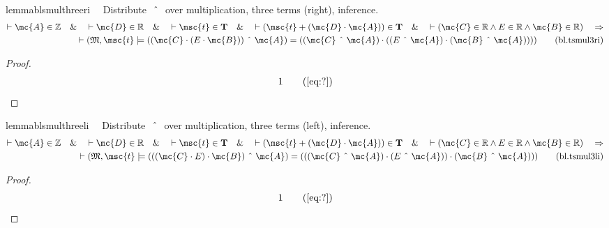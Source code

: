 \begin{restatable}{lemma}{blsmulthreeri}~~ Distribute $~\string^~$ over
multiplication, three terms (right), inference.
\begin{align}
\vdash \mc{A} \in \mathbb{Z}\quad\&\quad \vdash \mc{D} \in
    \mathbb{R}\quad\&\quad \vdash \msc{t} \in \mathbf{T}\quad\&\quad \vdash (
    \msc{t} + ( \mc{D} \cdot \mc{A} ) ) \in \mathbf{T}\quad\&\quad \vdash (
    \mc{C} \in \mathbb{R} \wedge E \in \mathbb{R} \wedge \mc{B} \in \mathbb{R}
    )\quad\Rightarrow \notag \\ 
	\quad \vdash ( \mathfrak{M} , \msc{t} \models ( ( \mc{C}
    \cdot ( E \cdot \mc{B} ) ) ~\string^~ \mc{A} ) = ( ( \mc{C} ~\string^~
    \mc{A} ) \cdot ( ( E ~\string^~ \mc{A} ) \cdot ( \mc{B} ~\string^~ \mc{A} )
    ) ) )\label{eq:bl.tsmul3ri}\tag{bl.tsmul3ri}
\end{align}
\end{restatable}

\begin{proof}
\begin{align}
  1 &&  & &(\mbox{\ref{eq:?}})\notag
\end{align}
\end{proof}

\begin{restatable}{lemma}{blsmulthreeli}~~ Distribute $~\string^~$ over
multiplication, three terms (left), inference.
\begin{align}
\vdash \mc{A} \in \mathbb{Z}\quad\&\quad \vdash \mc{D} \in
    \mathbb{R}\quad\&\quad \vdash \msc{t} \in \mathbf{T}\quad\&\quad \vdash (
    \msc{t} + ( \mc{D} \cdot \mc{A} ) ) \in \mathbf{T}\quad\&\quad \vdash (
    \mc{C} \in \mathbb{R} \wedge E \in \mathbb{R} \wedge \mc{B} \in \mathbb{R}
    )\quad\Rightarrow \notag \\ 
	\quad \vdash ( \mathfrak{M} , \msc{t} \models ( ( ( \mc{C}
    \cdot E ) \cdot \mc{B} ) ~\string^~ \mc{A} ) = ( ( ( \mc{C} ~\string^~
    \mc{A} ) \cdot ( E ~\string^~ \mc{A} ) ) \cdot ( \mc{B} ~\string^~ \mc{A} )
    ) )\label{eq:bl.tsmul3li}\tag{bl.tsmul3li}
\end{align}
\end{restatable}

\begin{proof}
\begin{align}
  1 &&  & &(\mbox{\ref{eq:?}})\notag
\end{align}
\end{proof}

